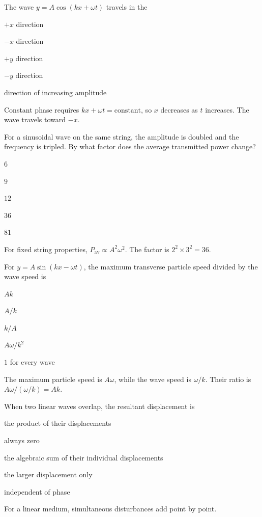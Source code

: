 \documentclass[10pt,a4paper,full]{physicsquiz}
\newcommand{\bankq}[9]{%
  \begin{quizquestion}[
    id=#1,
    topic={#2},
    difficulty=#3,
    marks=1,
    correct=#4,
    tags={#5},
    outcome={#6}
  ]
    #7
    \begin{choiceoptions}
      #8
    \end{choiceoptions}
  \end{quizquestion}
  \begin{quizsolution}
    #9
  \end{quizsolution}
}
\begin{document}
\begin{quizbank}
\bankq{waves-051}{Wave Properties and Classification}{applied}{B}{waves,direction}{Determine propagation direction from phase.}{%
The wave \(y=A\cos(kx+\omega t)\) travels in the}{%
\item \(+x\) direction
\item \(-x\) direction
\item \(+y\) direction
\item \(-y\) direction
\item direction of increasing amplitude}{%
Constant phase requires \(kx+\omega t=\text{constant}\), so \(x\) decreases as \(t\) increases. The wave travels toward \(-x\).}

\bankq{waves-052}{Wave Properties and Classification}{challenge}{D}{waves,energy,scaling}{Apply wave-power scaling.}{%
For a sinusoidal wave on the same string, the amplitude is doubled and the frequency is tripled. By what factor does the average transmitted power change?}{%
\item \(6\)
\item \(9\)
\item \(12\)
\item \(36\)
\item \(81\)}{%
For fixed string properties, \(P_{\text{av}}\propto A^2\omega^2\). The factor is \(2^2\times3^2=36\).}

\bankq{waves-053}{Wave Properties and Classification}{challenge}{A}{waves,particle-motion}{Distinguish particle velocity from wave velocity.}{%
For \(y=A\sin(kx-\omega t)\), the maximum transverse particle speed divided by the wave speed is}{%
\item \(Ak\)
\item \(A/k\)
\item \(k/A\)
\item \(A\omega/k^2\)
\item \(1\) for every wave}{%
The maximum particle speed is \(A\omega\), while the wave speed is \(\omega/k\). Their ratio is \(A\omega/(\omega/k)=Ak\).}


\bankq{phenomena-054}{Interference, Diffraction, Dispersion, and Polarization}{foundation}{C}{superposition,principle}{State the superposition principle.}{%
When two linear waves overlap, the resultant displacement is}{%
\item the product of their displacements
\item always zero
\item the algebraic sum of their individual displacements
\item the larger displacement only
\item independent of phase}{%
For a linear medium, simultaneous disturbances add point by point.}


\end{quizbank}
\end{document}
